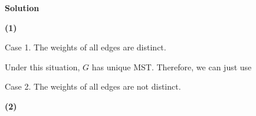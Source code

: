 \noindent
\textbf{Solution}

\noindent
\textbf{(1)}

Case 1. The weights of all edges are distinct.

Under this situation, $G$ has unique MST. Therefore, we can just use  

Case 2. The weights of all edges are not distinct.




\noindent
\textbf{(2)}